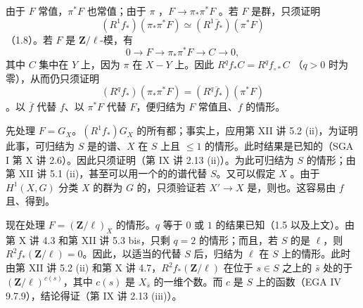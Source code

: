 由于 $F$ 常值，$\pi^*F$ 也常值；由于 $\pi$ ，$F\to\pi_*\pi^*F$ 。若 $F$ 是群，只须证明
\[
(R^1f_*)(\pi_*\pi^*F)\simeq(R^1\overline f_*)(\pi^*F)
\]
（1.8）。若 $F$ 是 $\mathbf Z/\ell$-模，有
\[
0\longrightarrow F\longrightarrow\pi_*\pi^*F\longrightarrow C\longrightarrow0,
\]
其中 $C$ 集中在 $Y$ 上，因为 $\pi$ 在 $X-Y$ 上。因此 $R^qf_*C=R^qf_{\circ*}C$ （$q>0$ 时为零），从而仍只须证明
\[
(R^qf_*)(\pi_*\pi^*F)=(R^q\overline f_*)(\pi^*F)
\]
。以 $\overline f$ 代替 $f$、以 $\pi^*F$ 代替 $F$，便归结为 $F$ 常值且、$f$ 的情形。

先处理 $F=G_X$。$(R^1f_*)G_X$ 的所有都；事实上，应用第 XII 讲 5.2 (ii)，为证明此事，可归结为 $S$ 是的谱、$X$ 在 $S$ 上且 $\leq1$ 的情形。此时结果是已知的（SGA I 第 X 讲 2.6）。因此只须证明（第 IX 讲 2.13 (ii)）。为此可归结为 $S$ 的情形；由第 XII 讲 5.1 (ii)，甚至可以用一个的的谱代替 $S$。又可以假定 $X$ 。由于 $H^1(X,G)$ 分类 $X$ 的群为 $G$ 的，只须验证若 $X'\to X$ 是，则也。这容易由 $f$ 且、得到。

现在处理 $F=(\mathbf Z/\ell)_X$ 的情形。$q$ 等于 $0$ 或 $1$ 的结果已知（1.5 以及上文）。由第 X 讲 4.3 和第 XII 讲 5.3 bis，只剩 $q=2$ 的情形；而且，若 $S$ 的是 $\ell$，则 $R^2f_*(\mathbf Z/\ell)=0$。因此，以适当的代替 $S$ 后，归结为 $\ell$ 在 $S$ 上的情形。此时由第 XII 讲 5.2 (ii) 和第 X 讲 4.7，$R^2f_*(\mathbf Z/\ell)$ 在位于 $s\in S$ 之上的 $\bar s$ 处的于 $(\mathbf Z/\ell)^{c(s)}$，其中 $c(s)$ 是 $X_{\bar s}$ 的一维个数。而 $c$ 是 $S$ 上的函数（EGA IV 9.7.9），结论得证（第 IX 讲 2.13 (iii)）。

